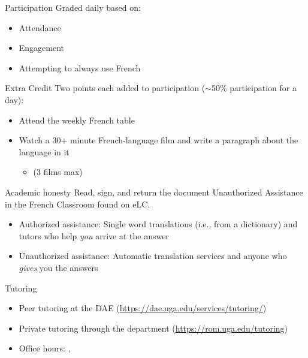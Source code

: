 \documentclass{beamer}
\begin{document}
  \begin{frame}{Participation}
    Graded daily based on:
    \begin{itemize}
      \item Attendance
      \item Engagement
      \item Attempting to always use French
    \end{itemize}
  \end{frame}

  \begin{frame}{Extra Credit}
    Two points each added to participation ($\sim$50\% participation for a day):
    \begin{itemize}
      \item Attend the weekly French table
      \item Watch a 30+ minute French-language film and write a paragraph about the language in it
      \begin{itemize}
        \item (3 films max)
      \end{itemize}
    \end{itemize}
  \end{frame}

  \begin{frame}{Academic honesty}
    Read, sign, and return the document Unauthorized Assistance in the French Classroom found on eLC.
    \begin{itemize}
      \item Authorized assistance: Single word translations (i.e., from a dictionary) and tutors who help \emph{you} arrive at the answer
      \item Unauthorized assistance: Automatic translation services and anyone who \emph{gives} you the answers
    \end{itemize}
  \end{frame}

  \begin{frame}{Tutoring}
    \begin{itemize}
      \item Peer tutoring at the DAE (\url{https://dae.uga.edu/services/tutoring/})
      \item Private tutoring through the department (\url{https://rom.uga.edu/tutoring})
      \item Office hours: , 
    \end{itemize}
  \end{frame}
\end{document}
